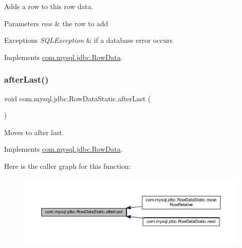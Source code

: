 Adds a row to this row data.


\begin{DoxyParams}{Parameters}
{\em row} & the row to add \\
\hline
\end{DoxyParams}

\begin{DoxyExceptions}{Exceptions}
{\em S\+Q\+L\+Exception} & if a database error occurs \\
\hline
\end{DoxyExceptions}


Implements \mbox{\hyperlink{interfacecom_1_1mysql_1_1jdbc_1_1_row_data_ac44d5df9c92d845272df5a13f15b9de7}{com.\+mysql.\+jdbc.\+Row\+Data}}.

\mbox{\label{classcom_1_1mysql_1_1jdbc_1_1_row_data_static_a73788dcf4de42302d7accc1846138fbf}} 
\subsubsection{\texorpdfstring{after\+Last()}{afterLast()}}
{\footnotesize\ttfamily void com.\+mysql.\+jdbc.\+Row\+Data\+Static.\+after\+Last (\begin{DoxyParamCaption}{ }\end{DoxyParamCaption})}

Moves to after last. 

Implements \mbox{\hyperlink{interfacecom_1_1mysql_1_1jdbc_1_1_row_data_a465a997f2fddb9de5ee12340944084fc}{com.\+mysql.\+jdbc.\+Row\+Data}}.

Here is the caller graph for this function\+:
\nopagebreak
\begin{figure}[H]
\begin{center}
\leavevmode
\includegraphics[width=350pt]{classcom_1_1mysql_1_1jdbc_1_1_row_data_static_a73788dcf4de42302d7accc1846138fbf_icgraph}
\end{center}
\end{figure}
\mbox{\label{classcom_1_1mysql_1_1jdbc_1_1_row_data_static_a54d6e62be02d4dac8e48a6eef0b2d839}} 
